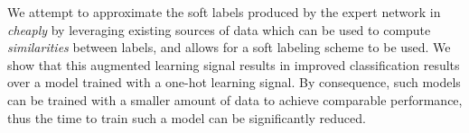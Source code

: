 We attempt to approximate the soft labels produced by the expert network in
\cite{hinton2015distilling} \emph{cheaply} by leveraging existing sources of
data which can be used to compute \emph{similarities} between labels, and allows
for a soft labeling scheme to be used.  We show that this augmented learning
signal results in improved classification results over a model trained with a
one-hot learning signal. By consequence, such models can be trained with a
smaller amount of data to achieve comparable performance, thus the time to train
such a model can be significantly reduced.


